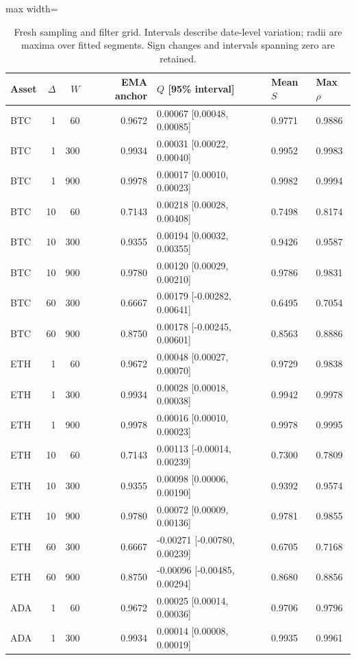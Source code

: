 \documentclass[12pt]{article}
\theoremstyle{definition}
\theoremstyle{remark}
\begin{document}
\begin{table}[htbp]
\centering\small
\caption{Fresh sampling and filter grid. Intervals describe date-level variation; radii are maxima over fitted segments. Sign changes and intervals spanning zero are retained.}
\label{tab:grid_revised}
\begin{adjustbox}{max width=\textwidth}
\begin{tabular}{lrrrlll}\toprule
Asset & $\Delta$ & $W$ & EMA anchor & $Q$ [95\% interval] & Mean $S$ & Max $\rho$ \\\midrule
BTC & 1 & 60 & 0.9672 & 0.00067 [0.00048, 0.00085] & 0.9771 & 0.9886 \\
BTC & 1 & 300 & 0.9934 & 0.00031 [0.00022, 0.00040] & 0.9952 & 0.9983 \\
BTC & 1 & 900 & 0.9978 & 0.00017 [0.00010, 0.00023] & 0.9982 & 0.9994 \\
BTC & 10 & 60 & 0.7143 & 0.00218 [0.00028, 0.00408] & 0.7498 & 0.8174 \\
BTC & 10 & 300 & 0.9355 & 0.00194 [0.00032, 0.00355] & 0.9426 & 0.9587 \\
BTC & 10 & 900 & 0.9780 & 0.00120 [0.00029, 0.00210] & 0.9786 & 0.9831 \\
BTC & 60 & 300 & 0.6667 & 0.00179 [-0.00282, 0.00641] & 0.6495 & 0.7054 \\
BTC & 60 & 900 & 0.8750 & 0.00178 [-0.00245, 0.00601] & 0.8563 & 0.8886 \\
ETH & 1 & 60 & 0.9672 & 0.00048 [0.00027, 0.00070] & 0.9729 & 0.9838 \\
ETH & 1 & 300 & 0.9934 & 0.00028 [0.00018, 0.00038] & 0.9942 & 0.9978 \\
ETH & 1 & 900 & 0.9978 & 0.00016 [0.00010, 0.00023] & 0.9978 & 0.9995 \\
ETH & 10 & 60 & 0.7143 & 0.00113 [-0.00014, 0.00239] & 0.7300 & 0.7809 \\
ETH & 10 & 300 & 0.9355 & 0.00098 [0.00006, 0.00190] & 0.9392 & 0.9574 \\
ETH & 10 & 900 & 0.9780 & 0.00072 [0.00009, 0.00136] & 0.9781 & 0.9855 \\
ETH & 60 & 300 & 0.6667 & -0.00271 [-0.00780, 0.00239] & 0.6705 & 0.7168 \\
ETH & 60 & 900 & 0.8750 & -0.00096 [-0.00485, 0.00294] & 0.8680 & 0.8856 \\
ADA & 1 & 60 & 0.9672 & 0.00025 [0.00014, 0.00036] & 0.9706 & 0.9796 \\
ADA & 1 & 300 & 0.9934 & 0.00014 [0.00008, 0.00019] & 0.9935 & 0.9961 \\

\end{tabular}
\end{adjustbox}
\end{table}
\end{document}
